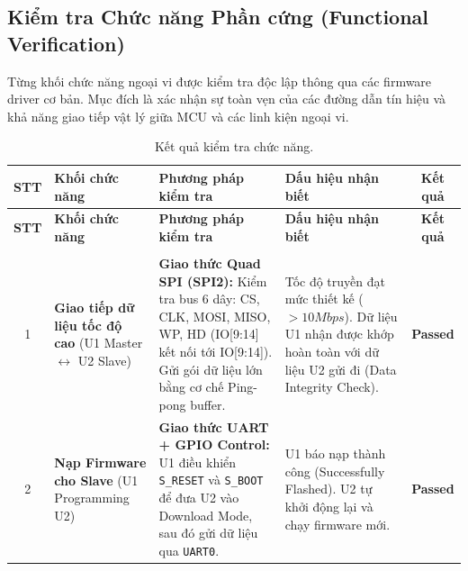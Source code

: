     \subsection{Kiểm tra Chức năng Phần cứng (Functional Verification)}
        Từng khối chức năng ngoại vi được kiểm tra độc lập thông qua các firmware driver cơ bản. Mục đích là xác nhận sự toàn vẹn của các đường dẫn tín hiệu và khả năng giao tiếp vật lý giữa MCU và các linh kiện ngoại vi.

        \begin{longtable}{|c|p{3.5cm}|p{5cm}|p{3.5cm}|c|}
            \caption{Kết quả kiểm tra chức năng.}
            \label{tab:detailed_functional_verification_final} \\
            \hline
            \textbf{STT} & \textbf{Khối chức năng} & \textbf{Phương pháp kiểm tra} & \textbf{Dấu hiệu nhận biết} & \textbf{Kết quả} \\ \hline
            \endfirsthead
            \hline
            \textbf{STT} & \textbf{Khối chức năng} & \textbf{Phương pháp kiểm tra} & \textbf{Dấu hiệu nhận biết} & \textbf{Kết quả} \\ \hline
            \endhead
            \hline
            \endfoot
            \endlastfoot

            \multicolumn{5}{|l|}{\textbf{A. GIAO TIẾP VI ĐIỀU KHIỂN}} \\ \hline

            1 & \textbf{Giao tiếp dữ liệu tốc độ cao} \newline (U1 Master $\leftrightarrow$ U2 Slave) & \textbf{Giao thức Quad SPI (SPI2):} \newline Kiểm tra bus 6 dây: CS, CLK, MOSI, MISO, WP, HD (IO[9:14] kết nối tới IO[9:14]). Gửi gói dữ liệu lớn bằng cơ chế Ping-pong buffer. & Tốc độ truyền đạt mức thiết kế ($> 10Mbps$). Dữ liệu U1 nhận được khớp hoàn toàn với dữ liệu U2 gửi đi (Data Integrity Check). & \textcolor{modern_blue}{\textbf{Passed}} \\ \hline

            2 & \textbf{Nạp Firmware cho Slave} \newline (U1 Programming U2) & \textbf{Giao thức UART + GPIO Control:} \newline U1 điều khiển \texttt{S\_RESET} và \texttt{S\_BOOT} để đưa U2 vào Download Mode, sau đó gửi dữ liệu qua \texttt{UART0}. & U1 báo nạp thành công (Successfully Flashed). U2 tự khởi động lại và chạy firmware mới. & \textcolor{modern_blue}{\textbf{Passed}} \\ \hline


\end{longtable}
